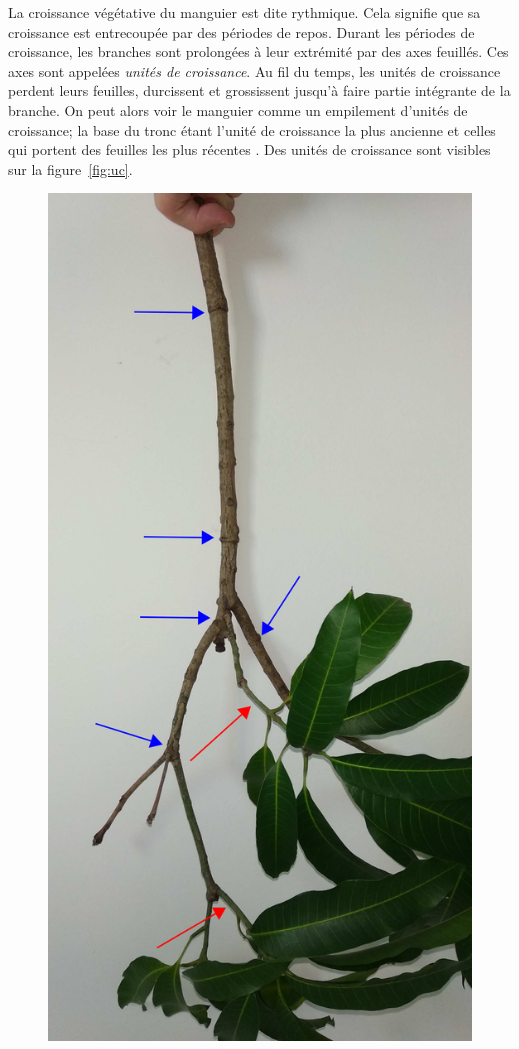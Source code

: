 La croissance végétative du manguier est dite rythmique.
Cela signifie que sa croissance est entrecoupée par des périodes de repos.
Durant les périodes de croissance, les branches sont prolongées à leur extrémité par des axes feuillés.
Ces axes sont appelées \emph{unités de croissance}. 
Au fil du temps, les unités de croissance perdent leurs feuilles, durcissent et grossissent jusqu'à faire partie intégrante de la branche.
On peut alors voir le manguier comme un empilement d'unités de croissance;
la base du tronc étant l'unité de croissance la plus ancienne et celles qui portent des feuilles les plus récentes \citep{normand2009}.
Des unités de croissance sont visibles sur la figure~\ref{fig:uc}.
\begin{figure}[ht]
 \centering
 \includegraphics[scale = 0.1, angle = -90]{photos/branche3.pdf}

\end{figure}
